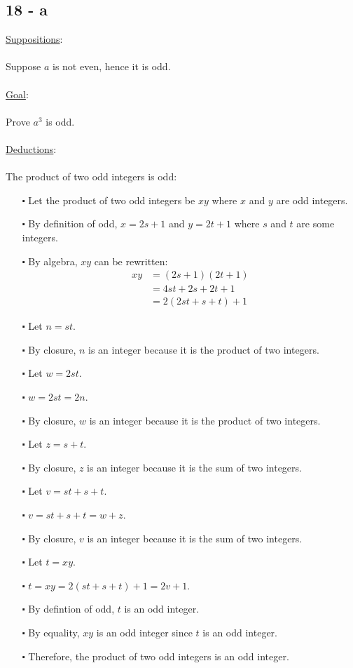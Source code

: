 \documentclass[12pt]{article}
\begin{document}
\subsection*{18 - a}
\underline{Suppositions}:
\\ \\
Suppose $a$ is not even, hence it is odd.
\\ \\
\underline{Goal}:
\\ \\
Prove $a^3$ is odd.
\\ \\
\underline{Deductions}:
\\ \\
The product of two odd integers is odd:
\begin{itemize}
  \item [$\centerdot$] Let the product of two odd integers be $xy$ where $x$ and $y$ are odd integers.
  \item [$\centerdot$] By definition of odd, $x=2s+1$ and $y=2t+1$ where $s$ and $t$ are some integers.
  \item [$\centerdot$] By algebra, $xy$ can be rewritten:
  \begin{align*}
    xy &= (2s+1)(2t+1) \\
    &= 4st+2s+2t+1 \\
    &= 2(2st+s+t)+1
  \end{align*}
  \item [$\centerdot$] Let $n = st$.
  \item [$\centerdot$] By closure, $n$ is an integer because it is the product of two integers.
  \item [$\centerdot$] Let $w = 2st$.
  \item [$\centerdot$] $w = 2st = 2n$.
  \item [$\centerdot$] By closure, $w$ is an integer because it is the product of two integers.
  \item [$\centerdot$] Let $z = s + t$.
  \item [$\centerdot$] By closure, $z$ is an integer because it is the sum of two integers.
  \item [$\centerdot$] Let $v = st+s+t$.
  \item [$\centerdot$] $v = st+s+t= w+z$.
  \item [$\centerdot$] By closure, $v$ is an integer because it is the sum of two integers.
  \item [$\centerdot$] Let $t=xy$.
  \item [$\centerdot$] $t = xy = 2(st+s+t)+1 = 2v + 1$.
  \item [$\centerdot$] By defintion of odd, $t$ is an odd integer.
  \item [$\centerdot$] By equality, $xy$ is an odd integer since $t$ is an odd integer.
  \item [$\centerdot$] Therefore, the product of two odd integers is an odd integer.
\end{itemize}
\end{document}
